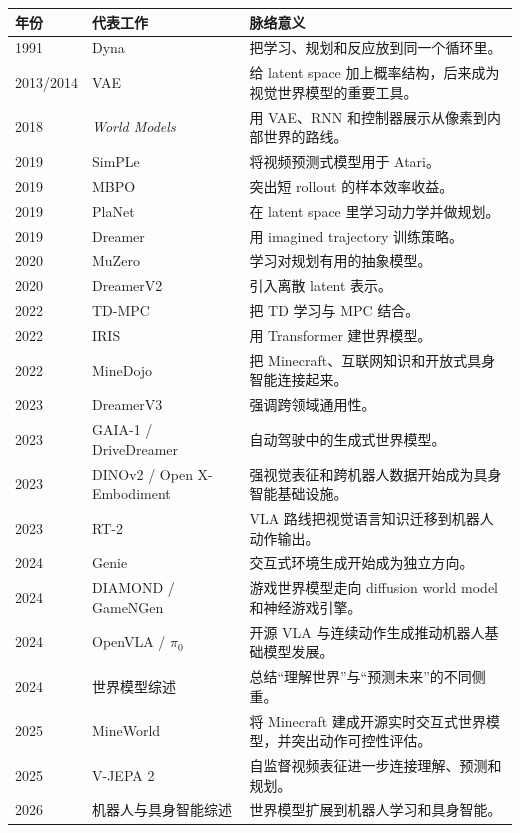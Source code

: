 \documentclass[11pt,a4paper]{ctexart}
\begin{document}
\begin{longtable}{p{} p{} p{}}
\toprule
年份 & 代表工作 & 脉络意义 \\
\midrule
1991 & Dyna \cite{sutton1991dyna} & 把学习、规划和反应放到同一个循环里。 \\
2013/2014 & VAE \cite{kingma2014vae} & 给 latent space 加上概率结构，后来成为视觉世界模型的重要工具。 \\
2018 & \emph{World Models} \cite{ha2018worldmodels} & 用 VAE、RNN 和控制器展示从像素到内部世界的路线。 \\
2019 & SimPLe \cite{kaiser2019simple} & 将视频预测式模型用于 Atari。 \\
2019 & MBPO \cite{janner2019mbpo} & 突出短 rollout 的样本效率收益。 \\
2019 & PlaNet \cite{hafner2019planet} & 在 latent space 里学习动力学并做规划。 \\
2019 & Dreamer \cite{hafner2020dreamer} & 用 imagined trajectory 训练策略。 \\
2020 & MuZero \cite{schrittwieser2020muzero} & 学习对规划有用的抽象模型。 \\
2020 & DreamerV2 \cite{hafner2021dreamerv2} & 引入离散 latent 表示。 \\
2022 & TD-MPC \cite{hansen2022tdmpc} & 把 TD 学习与 MPC 结合。 \\
2022 & IRIS \cite{micheli2022iris} & 用 Transformer 建世界模型。 \\
2022 & MineDojo \cite{fan2022minedojo} & 把 Minecraft、互联网知识和开放式具身智能连接起来。 \\
2023 & DreamerV3 \cite{hafner2023dreamerv3} & 强调跨领域通用性。 \\
2023 & GAIA-1 / DriveDreamer \cite{hu2023gaia,wang2023drivedreamer} & 自动驾驶中的生成式世界模型。 \\
2023 & DINOv2 / Open X-Embodiment \cite{oquab2023dinov2,openx2023rtx} & 强视觉表征和跨机器人数据开始成为具身智能基础设施。 \\
2023 & RT-2 \cite{brohan2023rt2} & VLA 路线把视觉语言知识迁移到机器人动作输出。 \\
2024 & Genie \cite{bruce2024genie} & 交互式环境生成开始成为独立方向。 \\
2024 & DIAMOND / GameNGen \cite{alonso2024diamond,valevski2024gamengen} & 游戏世界模型走向 diffusion world model 和神经游戏引擎。 \\
2024 & OpenVLA / $\pi_0$ \cite{kim2024openvla,black2024pi0} & 开源 VLA 与连续动作生成推动机器人基础模型发展。 \\
2024 & 世界模型综述 \cite{ding2024survey} & 总结“理解世界”与“预测未来”的不同侧重。 \\
2025 & MineWorld \cite{mineworld2025} & 将 Minecraft 建成开源实时交互式世界模型，并突出动作可控性评估。 \\
2025 & V-JEPA 2 \cite{assran2025vjepa2} & 自监督视频表征进一步连接理解、预测和规划。 \\
2026 & 机器人与具身智能综述 \cite{hou2026robotwm,wang2026wam} & 世界模型扩展到机器人学习和具身智能。 \\
\bottomrule
\end{longtable}
\end{document}

